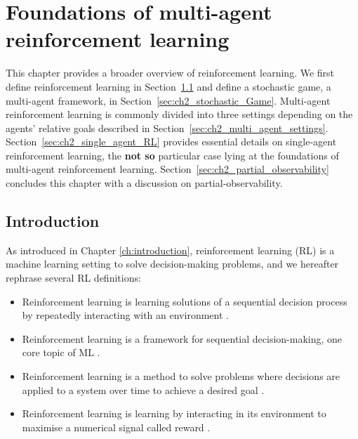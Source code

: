 \chapter{Foundations of multi-agent reinforcement learning} \label{ch:background}

\begin{chapter_outline}

This chapter provides a broader overview of reinforcement learning.
We first define reinforcement learning in Section~\ref{sec:ch2_Introduction} and define a stochastic game, a multi-agent framework, in Section~\ref{sec:ch2_stochastic_Game}.
Multi-agent reinforcement learning is commonly divided into three settings depending on the agents' relative goals described in Section~\ref{sec:ch2_multi_agent_settings}.
Section~\ref{sec:ch2_single_agent_RL} provides essential details on single-agent reinforcement learning, the \textbf{not so} particular case lying at the foundations of multi-agent reinforcement learning.
Section~\ref{sec:ch2_partial_observability} concludes this chapter with a discussion on partial-observability.

\end{chapter_outline}

\section{Introduction} 
\label{sec:ch2_Introduction}
As introduced in Chapter \ref{ch:introduction}, reinforcement learning (RL) is a machine learning setting to solve decision-making problems, and we hereafter rephrase several RL definitions:
\begin{itemize}
\item Reinforcement learning is learning solutions of a sequential decision process by repeatedly interacting with an environment \citep{marl-book}.
\item Reinforcement learning is a framework for sequential decision-making, one core topic of ML \citep{introDeepRL}.
\item Reinforcement learning is a method to solve problems where decisions are applied to a system over time to achieve a desired goal \citep{BusoniuErnstBook}.
\item Reinforcement learning is learning by interacting in its environment to maximise a numerical signal called reward \citep{sutton2018reinforcement}.
\end{itemize}

